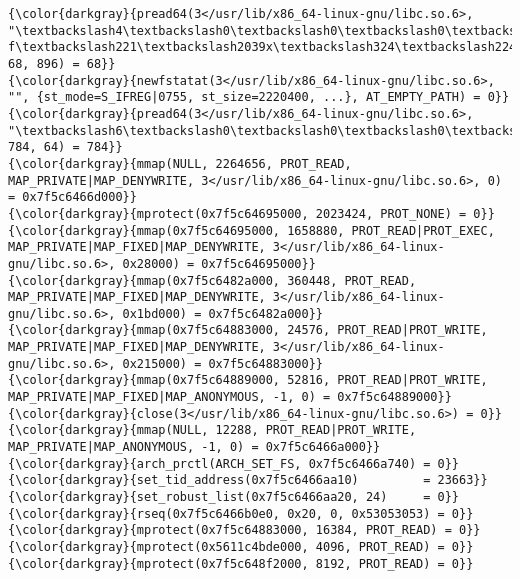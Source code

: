 {{{{\begin{Verbatim}[commandchars=\\\{\}]
{\color{darkgray}{pread64(3</usr/lib/x86_64-linux-gnu/libc.so.6>, "\textbackslash4\textbackslash0\textbackslash0\textbackslash0\textbackslash24\textbackslash0\textbackslash0\textbackslash0\textbackslash3\textbackslash0\textbackslash0\textbackslash0GNU\textbackslash0I\textbackslash17\textbackslash357\textbackslash204\textbackslash3$\textbackslash f\textbackslash221\textbackslash2039x\textbackslash324\textbackslash224\textbackslash323\textbackslash236S"..., 68, 896) = 68}}
{\color{darkgray}{newfstatat(3</usr/lib/x86_64-linux-gnu/libc.so.6>, "", {st_mode=S_IFREG|0755, st_size=2220400, ...}, AT_EMPTY_PATH) = 0}}
{\color{darkgray}{pread64(3</usr/lib/x86_64-linux-gnu/libc.so.6>, "\textbackslash6\textbackslash0\textbackslash0\textbackslash0\textbackslash4\textbackslash0\textbackslash0\textbackslash0@\textbackslash0\textbackslash0\textbackslash0\textbackslash0\textbackslash0\textbackslash0\textbackslash0@\textbackslash0\textbackslash0\textbackslash0\textbackslash0\textbackslash0\textbackslash0\textbackslash0@\textbackslash0\textbackslash0\textbackslash0\textbackslash0\textbackslash0\textbackslash0\textbackslash0"..., 784, 64) = 784}}
{\color{darkgray}{mmap(NULL, 2264656, PROT_READ, MAP_PRIVATE|MAP_DENYWRITE, 3</usr/lib/x86_64-linux-gnu/libc.so.6>, 0) = 0x7f5c6466d000}}
{\color{darkgray}{mprotect(0x7f5c64695000, 2023424, PROT_NONE) = 0}}
{\color{darkgray}{mmap(0x7f5c64695000, 1658880, PROT_READ|PROT_EXEC, MAP_PRIVATE|MAP_FIXED|MAP_DENYWRITE, 3</usr/lib/x86_64-linux-gnu/libc.so.6>, 0x28000) = 0x7f5c64695000}}
{\color{darkgray}{mmap(0x7f5c6482a000, 360448, PROT_READ, MAP_PRIVATE|MAP_FIXED|MAP_DENYWRITE, 3</usr/lib/x86_64-linux-gnu/libc.so.6>, 0x1bd000) = 0x7f5c6482a000}}
{\color{darkgray}{mmap(0x7f5c64883000, 24576, PROT_READ|PROT_WRITE, MAP_PRIVATE|MAP_FIXED|MAP_DENYWRITE, 3</usr/lib/x86_64-linux-gnu/libc.so.6>, 0x215000) = 0x7f5c64883000}}
{\color{darkgray}{mmap(0x7f5c64889000, 52816, PROT_READ|PROT_WRITE, MAP_PRIVATE|MAP_FIXED|MAP_ANONYMOUS, -1, 0) = 0x7f5c64889000}}
{\color{darkgray}{close(3</usr/lib/x86_64-linux-gnu/libc.so.6>) = 0}}
{\color{darkgray}{mmap(NULL, 12288, PROT_READ|PROT_WRITE, MAP_PRIVATE|MAP_ANONYMOUS, -1, 0) = 0x7f5c6466a000}}
{\color{darkgray}{arch_prctl(ARCH_SET_FS, 0x7f5c6466a740) = 0}}
{\color{darkgray}{set_tid_address(0x7f5c6466aa10)         = 23663}}
{\color{darkgray}{set_robust_list(0x7f5c6466aa20, 24)     = 0}}
{\color{darkgray}{rseq(0x7f5c6466b0e0, 0x20, 0, 0x53053053) = 0}}
{\color{darkgray}{mprotect(0x7f5c64883000, 16384, PROT_READ) = 0}}
{\color{darkgray}{mprotect(0x5611c4bde000, 4096, PROT_READ) = 0}}
{\color{darkgray}{mprotect(0x7f5c648f2000, 8192, PROT_READ) = 0}}

\end{Verbatim}}}}}

